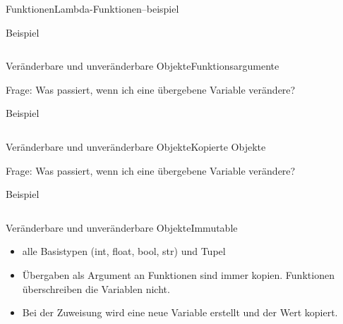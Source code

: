 \documentclass[xelatex,aspectratio=169]{beamer}
\begin{document}
\begin{frame}{Funktionen}{Lambda-Funktionen--beispiel}
    \begin{exampleblock}{Beispiel}
        \inputminted{python}{src/functions_lambda_example.py}
    \end{exampleblock}
\end{frame}

\begin{frame}[t]{Veränderbare und unveränderbare Objekte}{Funktionsargumente}
    \begin{alertblock}{Frage:}
        Was passiert, wenn ich eine übergebene Variable verändere?
    \end{alertblock}

    \begin{exampleblock}{Beispiel}
        \inputminted{python}{src/functions_mutable_example.py}
    \end{exampleblock}

\end{frame}


\begin{frame}[t]{Veränderbare und unveränderbare Objekte}{Kopierte Objekte}
    \begin{alertblock}{Frage:}
        Was passiert, wenn ich eine übergebene Variable verändere?
    \end{alertblock}

    \begin{exampleblock}{Beispiel}
        \inputminted{python}{src/functions_copy_example.py}
    \end{exampleblock}

\end{frame}

\begin{frame}{Veränderbare und unveränderbare Objekte}{Immutable}
    \begin{itemize}
        \item alle Basistypen (int, float, bool, str) und Tupel
        \item Übergaben als Argument an Funktionen sind immer kopien. Funktionen überschreiben die Variablen nicht.
        \item Bei der Zuweisung wird eine neue Variable erstellt und der Wert kopiert.
    \end{itemize}

\end{frame}
\end{document}
